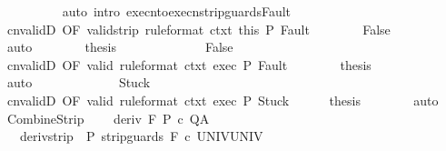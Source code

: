 \begin{isabellebody}
\ \ \ \ \ \ \ \ \isamarkupfalse%
\ {\isacharparenleft}auto\ intro{\isacharcolon}\ execn{\isacharunderscore}to{\isacharunderscore}execn{\isacharunderscore}strip{\isacharunderscore}guards{\isacharunderscore}Fault{\isacharparenright}\isanewline
\ \ \ \ \ \ \isamarkupfalse%
\ cnvalidD\ {\isacharbrackleft}OF\ valid{\isacharunderscore}strip\ {\isacharbrackleft}rule{\isacharunderscore}format{\isacharbrackright}\ ctxt\ this\ P{\isacharbrackright}\ Fault\isanewline
\ \ \ \ \ \ \isamarkupfalse%
\ False\isanewline
\ \ \ \ \ \ \ \ \isamarkupfalse%
\ auto\isanewline
\ \ \ \ \ \ \isamarkupfalse%
\ {\isacharquery}thesis\ \isacommand{{\isachardot}{\isachardot}}\isamarkupfalse%
\isanewline
\ \ \ \ \isamarkupfalse%
\isanewline
\ \ \ \ \ \ \isamarkupfalse%
\ False\isanewline
\ \ \ \ \ \ \isamarkupfalse%
\ cnvalidD\ {\isacharbrackleft}OF\ valid\ {\isacharbrackleft}rule{\isacharunderscore}format{\isacharbrackright}\ ctxt{\isacharprime}\ exec\ P{\isacharbrackright}\ Fault\isanewline
\ \ \ \ \ \ \isamarkupfalse%
\ {\isacharquery}thesis\isanewline
\ \ \ \ \ \ \ \ \isamarkupfalse%
\ auto\isanewline
\ \ \ \ \isamarkupfalse%
\isanewline
\ \ \isamarkupfalse%
\isanewline
\ \ \ \ \isamarkupfalse%
\ Stuck\isanewline
\ \ \ \ \isamarkupfalse%
\ cnvalidD\ {\isacharbrackleft}OF\ valid\ {\isacharbrackleft}rule{\isacharunderscore}format{\isacharbrackright}\ ctxt{\isacharprime}\ exec\ P{\isacharbrackright}\ Stuck\isanewline
\ \ \ \ \isamarkupfalse%
\ {\isacharquery}thesis\isanewline
\ \ \ \ \ \ \isamarkupfalse%
\ auto\isanewline
\ \ \isamarkupfalse%
\isanewline
{}\isamarkupfalse%
%
\endisatagproof
{\isafoldproof}%
%
\isadelimproof
\isanewline
%
\endisadelimproof
\isanewline
{}\isamarkupfalse%
\ CombineStrip{\isacharcolon}\ \isanewline
\ \ \ deriv{\isacharcolon}\ {\isachardoublequoteopen}{\isasymGamma}{\isacharcomma}{\isasymTheta}{\isasymturnstile}\isactrlbsub {\isacharslash}F\isactrlesub \ P\ c\ Q{\isacharcomma}A{\isachardoublequoteclose}\isanewline
\ \ \ deriv{\isacharunderscore}strip{\isacharcolon}\ {\isachardoublequoteopen}{\isasymGamma}{\isacharcomma}{\isasymTheta}{\isasymturnstile}\isactrlbsub {\isacharslash}{\isacharbraceleft}{\isacharbraceright}\isactrlesub \ P\ {\isacharparenleft}strip{\isacharunderscore}guards\ {\isacharparenleft}{\isacharminus}F{\isacharparenright}\ c{\isacharparenright}\ UNIV{\isacharcomma}UNIV{\isachardoublequoteclose}\isanewline

\end{isabellebody}
